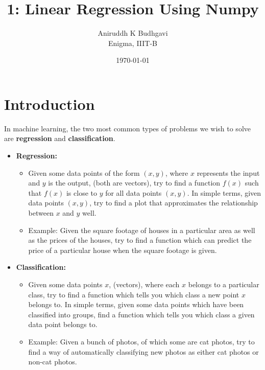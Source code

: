 \documentclass{article}
\title{1: Linear Regression Using Numpy}
\date{\today}
\author{Aniruddh K Budhgavi \\Enigma, IIIT-B}
\begin{document}
    \maketitle

    \section{Introduction}
        In machine learning, the two most common types of 
        problems we wish to solve are \textbf{regression} and 
        \textbf{classification}.
        \begin{itemize}
            \item \textbf{Regression:}
            \begin{itemize}
                \item Given some data points of the form $(x, y)$, where
                $x$ represents the input and $y$ is the output, (both are vectors),
                try to find a function $f(x)$ such that $f(x)$ is close to $y$ for all data points $(x, y)$.
                In simple terms, given data points $(x, y)$, try to find a plot that approximates 
                the relationship between $x$ and $y$ well.

                \item Example: Given the square footage of houses in a particular area 
                as well as the prices of the houses, try to find a function which can predict the 
                price of a particular house when the square footage is given.
            \end{itemize}
            \item \textbf{Classification:}
            \begin{itemize}
                \item Given some data points $x$, (vectors), where each $x$ belongs to a particular class,
                try to find a function which tells you which class a new point $x$ belongs to. In simple terms,
                given some data points which have been classified into groups, find a function which tells you which 
                class a given data point belongs to.

                \item Example: Given a bunch of photos, of which some are cat photos, try to find a 
                way of automatically classifying new photos as either cat photos or non-cat photos.
            \end{itemize}
        \end{itemize}
\end{document}

